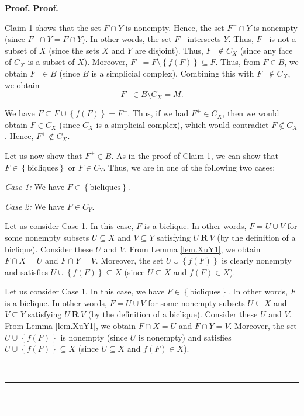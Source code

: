 \documentclass[numbers=enddot,12pt,final,onecolumn,notitlepage]{scrartcl}%
\theoremstyle{definition}
\newenvironment{proof}[1][Proof]{\noindent\textbf{#1.} }{\ \rule{0.5em}{0.5em}}
\newenvironment{verlong}{}{}
\newenvironment{vershort}{}{}
\begin{document}
\begin{proof}
\begin{proof}
\begin{verlong}
\end{verlong}

Claim 1 shows that the set $F\cap Y$ is nonempty. Hence, the set $F^{-}\cap Y$
is nonempty (since $F^{-}\cap Y=F\cap Y$). In other words, the set $F^{-}$
intersects $Y$. Thus, $F^{-}$ is not a subset of $X$ (since the sets $X$ and
$Y$ are disjoint). Thus, $F^{-}\notin C_{X}$ (since any face of $C_{X}$ is a
subset of $X$). Moreover, $F^{-}=F\setminus\left\{  f\left(  F\right)
\right\}  \subseteq F$. Thus, from $F\in B$, we obtain $F^{-}\in B$ (since $B$
is a simplicial complex). Combining this with $F^{-}\notin C_{X}$, we obtain
\[
F^{-}\in B\setminus C_{X}=M.
\]


We have $F\subseteq F\cup\left\{  f\left(  F\right)  \right\}  =F^{+}$. Thus,
if we had $F^{+}\in C_{X}$, then we would obtain $F\in C_{X}$ (since $C_{X}$
is a simplicial complex), which would contradict $F\notin C_{X}$. Hence,
$F^{+}\notin C_{X}$.

Let us now show that $F^{+}\in B$. As in the proof of Claim 1, we can show
that $F\in\left\{  \text{bicliques}\right\}  $ or $F\in C_{Y}$. Thus, we are
in one of the following two cases:

\textit{Case 1:} We have $F\in\left\{  \text{bicliques}\right\}  $.

\textit{Case 2:} We have $F\in C_{Y}$.

\begin{vershort}
Let us consider Case 1. In this case, $F$ is a biclique. In other words,
$F=U\cup V$ for some nonempty subsets $U\subseteq X$ and $V\subseteq Y$
satisfying $U\ \mathbf{R}\ V$ (by the definition of a biclique). Consider
these $U$ and $V$. From Lemma \ref{lem.XuY1}, we obtain $F\cap X=U$ and $F\cap
Y=V$. Moreover, the set $U\cup\left\{  f\left(  F\right)  \right\}  $ is
clearly nonempty and satisfies $U\cup\left\{  f\left(  F\right)  \right\}
\subseteq X$ (since $U\subseteq X$ and $f\left(  F\right)  \in X$).
\end{vershort}

\begin{verlong}
Let us consider Case 1. In this case, we have $F\in\left\{  \text{bicliques}%
\right\}  $. In other words, $F$ is a biclique. In other words, $F=U\cup V$
for some nonempty subsets $U\subseteq X$ and $V\subseteq Y$ satisfying
$U\ \mathbf{R}\ V$ (by the definition of a biclique). Consider these $U$ and
$V$. From Lemma \ref{lem.XuY1}, we obtain $F\cap X=U$ and $F\cap Y=V$.
Moreover, the set $U\cup\left\{  f\left(  F\right)  \right\}  $ is nonempty
(since $U$ is nonempty) and satisfies $U\cup\left\{  f\left(  F\right)
\right\}  \subseteq X$ (since $U\subseteq X$ and $f\left(  F\right)  \in X$).
\end{verlong}


\end{proof}
\end{proof}
\end{document}
